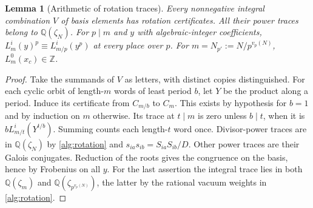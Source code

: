 \documentclass[11pt]{amsart}
\numberwithin{equation}{section}
\newtheorem{lemma}[theorem]{Lemma}
\theoremstyle{definition}
\theoremstyle{plain}
\newcommand{\QQ}{\mathbb Q}
\newcommand{\ZZ}{\mathbb Z}
\begin{document}
\begin{lemma}[Arithmetic of rotation traces]\label{alg:rotation-arithmetic}
Every nonnegative integral combination $V$ of basis elements has
rotation certificates. All their power traces belong to $\QQ(\zeta_N)$.
For $p\mid m$ and $y$ with algebraic-integer coefficients,
$L_m^i(y)^p\equiv L_{m/p}^i(y^p)$ at every place over $p$.
For $m=N_{p'}:=N/p^{v_p(N)}$, $L_m^0(x_c)\in\ZZ$.
\end{lemma}
\begin{proof}
Take the summands of $V$ as letters, with distinct copies distinguished.
For each cyclic orbit of length-$m$ words of least period $b$, let $Y$
be the product along a period. Induce its certificate from $C_{m/b}$
to $C_m$. This exists by hypothesis for $b=1$ and by induction on $m$
otherwise. Its trace at $t\mid m$ is zero unless $b\mid t$, when it is
$bL_{m/t}^i(Y^{t/b})$. Summing counts each length-$t$ word once.
Divisor-power traces are in $\QQ(\zeta_N)$ by \eqref{alg:rotation}
and $s_{ia}s_{ib}=S_{ia}S_{ib}/D$. Other power traces are their
Galois conjugates. Reduction of the roots gives the congruence on the
basis, hence by Frobenius on all $y$. For the last assertion the
integral trace lies in both $\QQ(\zeta_m)$ and $\QQ(\zeta_{p^{v_p(N)}})$,
the latter by the rational vacuum weights in \eqref{alg:rotation}.
\end{proof}
\end{document}
